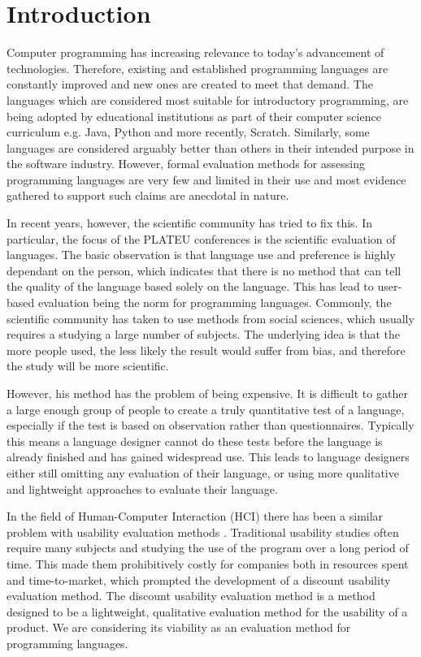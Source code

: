 \chapter{Introduction}
\label{chap:introduction}

Computer programming has increasing relevance to today's advancement of technologies. Therefore, existing and established programming languages are constantly improved and new ones are created to meet that demand. The languages which are considered most suitable for introductory programming, are being adopted by educational institutions as part of their computer science curriculum e.g. Java, Python and more recently, Scratch\cite{PracticeTeachingIntro}. Similarly, some languages are considered arguably better than others in their intended purpose in the software industry. However, formal evaluation methods for assessing programming languages are very few and limited in their use and most evidence gathered to support such claims are anecdotal in nature\cite{StakingClaims}. 

In recent years, however, the scientific community has tried to fix this.
In particular, the focus of the PLATEU conferences is the scientific evaluation of languages.
The basic observation is that language use and preference is highly dependant on the person, which indicates that there is no method that can tell the quality of the language based solely on the language.
This has lead to user-based evaluation being the norm for programming languages.
Commonly, the scientific community has taken to use methods from social sciences, which usually requires a studying a large number of subjects\cite{SocioPLT}\cite{AliceCS1}\cite{BlockOrNot}\cite{FromScratch}.
The underlying idea is that the more people used, the less likely the result would suffer from bias, and therefore the study will be more scientific.

However, his method has the problem of being expensive.
It is difficult to gather a large enough group of people to create a truly quantitative test of a language, especially if the test is based on observation rather than questionnaires.
Typically this means a language designer cannot do these tests before the language is already finished and has gained widespread use.
This leads to language designers either still omitting any evaluation of their language, or using more qualitative and lightweight approaches to evaluate their language.

In the field of Human-Computer Interaction (HCI) there has been a similar problem with usability evaluation methods \cite{IDA}.
Traditional usability studies often require many subjects and studying the use of the program over a long period of time.
This made them prohibitively costly for companies both in resources spent and time-to-market, which prompted the development of a discount usability evaluation method\cite{AndrewMonk}.
The discount usability evaluation method is a method designed to be a lightweight, qualitative evaluation method for the usability of a product.
We are considering its viability as an evaluation method for programming languages.

